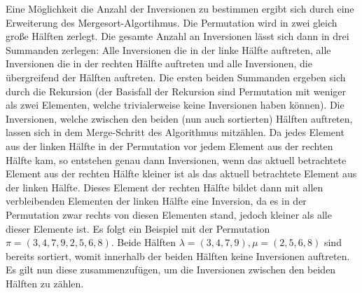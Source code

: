 \documentclass{whswinvcbook}
\begin{document}
Eine Möglichkeit die Anzahl der Inversionen zu bestimmen ergibt sich durch eine Erweiterung des Mergesort-Algortihmus.\cite{sedge} Die Permutation wird in zwei gleich große Hälften zerlegt. Die gesamte Anzahl an Inversionen lässt sich dann in drei Summanden zerlegen: Alle Inversionen die in der linke Hälfte auftreten, alle Inversionen die in der rechten Hälfte auftreten und alle Inversionen, die übergreifend der Hälften auftreten. Die ersten beiden Summanden ergeben sich durch die Rekursion (der Basisfall der Rekursion sind Permutation mit weniger als zwei Elementen, welche trivialerweise keine Inversionen haben können). Die Inversionen, welche zwischen den beiden (nun auch sortierten) Hälften auftreten, lassen sich in dem Merge-Schritt des Algorithmus mitzählen. Da jedes Element aus der linken Hälfte in der Permutation vor jedem Element aus der rechten Hälfte kam, so entstehen genau dann Inversionen, wenn das aktuell betrachtete Element aus der rechten Hälfte kleiner ist als das aktuell betrachtete Element aus der linken Hälfte. Dieses Element der rechten Hälfte bildet dann mit allen verbleibenden Elementen der linken Hälfte eine Inversion, da es in der Permutation zwar rechts von diesen Elementen stand, jedoch kleiner als alle dieser Elemente ist. Es folgt ein Beispiel mit der Permutation $\pi=(3,4,7,9,2,5,6,8)$. Beide Hälften $\lambda=(3,4,7,9),\mu=(2,5,6,8)$ sind bereits sortiert, womit innerhalb der beiden Hälften keine Inversionen auftreten. Es gilt nun diese zusammenzufügen, um die Inversionen zwischen den beiden Hälften zu zählen.
\end{document}
